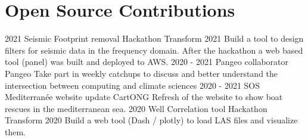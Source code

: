 \documentclass[]{friggeri-cv}
\begin{document}
\section{Open Source Contributions}
\begin{entrylist}
	\entry
	{2021}
	{Seismic Footprint removal Hackathon}
	{Transform 2021}
	{Build a tool to design filters for seismic data in the frequency domain. After the hackathon a web based tool (panel) was built and deployed to AWS.}
	\entry
	{2020 - 2021}
	{Pangeo collaborator}
	{Pangeo}
	{Take part in weekly catchups to discuss and better understand the intersection between computing and climate sciences}
	\entry
	{2020 - 2021}
	{SOS Mediterranée website update}
	{CartONG}
	{Refresh of the website to show boat rescues in the mediterranean sea.}
	\entry
	{2020}
	{Well Correlation tool Hackathon}
	{Transform 2020}
	{Build a web tool (Dash / plotly) to load LAS files and visualize them.}
\end{entrylist}
\end{document}
